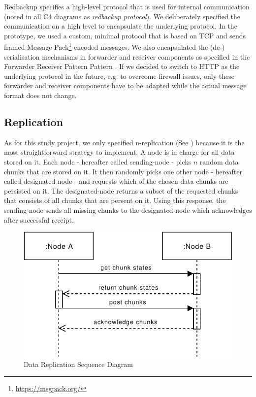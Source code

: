 Redbackup specifies a high-level protocol that is used for internal communication (noted in all C4 diagrams as \emph{redbackup protocol}). We deliberately specified the communication on a high level to encapsulate the underlying protocol. In the prototype, we used a custom, minimal protocol that is based on TCP and sends framed Message Pack\footnote{\url{https://msgpack.org/}} encoded messages. We also encapsulated the (de-) serialisation mechanisms in forwarder and receiver components as specified in the Forwarder Receiver Pattern Pattern \cite{POSA1}.  If we decided to switch to HTTP as the underlying protocol in the future, e.g. to overcome firewall issues, only these forwarder and receiver components have to be adapted while the actual message format does not change. 

\subsection{Replication}

As for this study project, we only specified n-replication (See ) because it is the most straightforward strategy to implement. A \gls{node} is in charge for all data stored on it. Each \gls{node} - hereafter called \gls{sending-node} -  picks $n$ random data \glspl{chunk} that are stored on it. It then randomly picks one other \gls{node} - hereafter called \gls{designated-node} - and requests which of the chosen data \glspl{chunk} are persisted on it. The \gls{designated-node} returns a subset of the requested \glspl{chunk} that consists of all \glspl{chunk} that are persent on it. Using this response, the \gls{sending-node} sends all missing \glspl{chunk} to the \gls{designated-node} which acknowledges after successful receipt.

\begin{figure}[h]
    \centering
    \includegraphics[width=0.6\linewidth]{resources/data_replication.pdf}
    \caption{Data Replication Sequence Diagram}
\end{figure}

